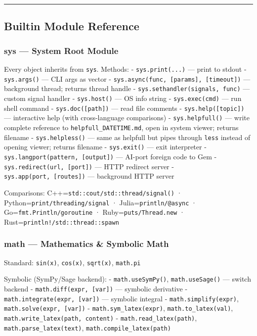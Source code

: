 \documentclass[
]{article}
\begin{document}
\begin{center}\rule{0.5\linewidth}{0.5pt}\end{center}

\subsection{Builtin Module Reference}\label{builtin-module-reference}

\subsubsection{sys --- System Root Module}\label{sys-system-root-module}

Every object inherits from \texttt{sys}. Methods: -
\texttt{sys.print(...)} --- print to stdout - \texttt{sys.args()} ---
CLI args as vector -
\texttt{sys.async(func,\ {[}params{]},\ {[}timeout{]})} --- background
thread; returns thread handle - \texttt{sys.sethandler(signals,\ func)}
--- custom signal handler - \texttt{sys.host()} --- OS info string -
\texttt{sys.exec(cmd)} --- run shell command -
\texttt{sys.doc({[}path{]})} --- read file comments -
\texttt{sys.help({[}topic{]})} --- interactive help (with cross-language
comparisons) - \texttt{sys.helpfull()} --- write complete reference to
\texttt{helpfull\_DATETIME.md}, open in system viewer; returns filename
- \texttt{sys.helpless()} --- same as helpfull but pipes through
\texttt{less} instead of opening viewer; returns filename -
\texttt{sys.exit()} --- exit interpreter -
\texttt{sys.langport(pattern,\ {[}output{]})} --- AI-port foreign code
to Gem - \texttt{sys.redirect(url,\ {[}port{]})} --- HTTP redirect
server - \texttt{sys.app(port,\ {[}routes{]})} --- background HTTP
server

Comparisons: C++=\texttt{std::cout/std::thread/signal()} ·
Python=\texttt{print/threading/signal} · Julia=\texttt{println/@async} ·
Go=\texttt{fmt.Println/goroutine} · Ruby=\texttt{puts/Thread.new} ·
Rust=\texttt{println!/std::thread::spawn}

\subsubsection{math --- Mathematics \& Symbolic
Math}\label{math-mathematics-symbolic-math}

Standard: \texttt{sin(x)}, \texttt{cos(x)}, \texttt{sqrt(x)},
\texttt{math.pi}

Symbolic (SymPy/Sage backend): - \texttt{math.useSymPy()},
\texttt{math.useSage()} --- switch backend -
\texttt{math.diff(expr,\ {[}var{]})} --- symbolic derivative -
\texttt{math.integrate(expr,\ {[}var{]})} --- symbolic integral -
\texttt{math.simplify(expr)}, \texttt{math.solve(expr,\ {[}var{]})} -
\texttt{math.sym\_latex(expr)}, \texttt{math.to\_latex(val)},
\texttt{math.write\_latex(path,\ content)} -
\texttt{math.read\_latex(path)}, \texttt{math.parse\_latex(text)},
\texttt{math.compile\_latex(path)}
\end{document}
